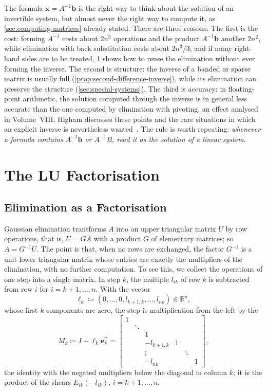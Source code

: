 The formula $\mathbf x=A^{-1}\mathbf b$ is the right way to think about the solution of an invertible system, but almost never the right way to compute it, as \cref{sec:computing-matrices} already stated. There are three reasons. The first is the cost: forming $A^{-1}$ costs about $2n^3$ operations and the product $A^{-1}\mathbf b$ another $2n^2$, while elimination with back substitution costs about $2n^3/3$; and if many right-hand sides are to be treated, \cref{sec:lu} shows how to reuse the elimination without ever forming the inverse. The second is structure: the inverse of a banded or sparse matrix is usually full (\cref{prop:second-difference-inverse}), while its elimination can preserve the structure (\cref{sec:special-systems}). The third is accuracy: in floating-point arithmetic, the solution computed through the inverse is in general less accurate than the one computed by elimination with pivoting, an effect analysed in Volume~VIII. Higham discusses these points and the rare situations in which an explicit inverse is nevertheless wanted~\cite[Chap.~14]{higham2002accuracy}. The rule is worth repeating: \emph{whenever a formula contains $A^{-1}\mathbf b$ or $A^{-1}B$, read it as the solution of a linear system}.
\section{The LU Factorisation}
\label{sec:lu}

\subsection{Elimination as a Factorisation}

Gaussian elimination transforms $A$ into an upper triangular matrix $U$ by row operations, that is, $U=GA$ with a product $G$ of elementary matrices; so $A=G^{-1}U$. The point is that, when no rows are exchanged, the factor $G^{-1}$ is a unit lower triangular matrix whose entries are exactly the multipliers of the elimination, with no further computation. To see this, we collect the operations of one step into a single matrix. In step $k$, the multiple $l_{ik}$ of row $k$ is subtracted from row $i$ for $i=k+1,\ldots,n$. With the vector
\[
\boldsymbol\ell_k\coloneqq(0,\ldots,0,l_{k+1,k},\ldots,l_{nk})\in\mathbb R^n,
\]
whose first $k$ components are zero, the step is multiplication from the left by the 
\[
M_k\coloneqq I-\boldsymbol\ell_k\mathbf e_k^{\mathsf T}=\begin{bmatrix}1&&&&&\\&\ddots&&&&\\&&1&&&\\&&-l_{k+1,k}&1&&\\&&\vdots&&\ddots&\\&&-l_{nk}&&&1\end{bmatrix},
\]
the identity with the negated multipliers below the diagonal in column $k$; it is the product of the shears $E_{ik}(-l_{ik})$, $i=k+1,\ldots,n$.

